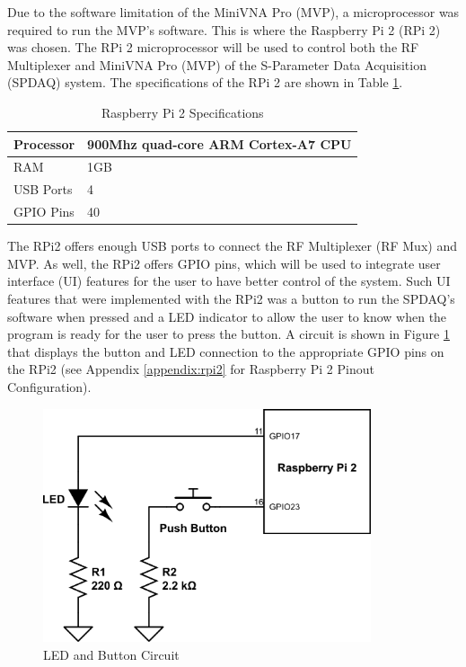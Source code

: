Due to the software limitation of the MiniVNA Pro (MVP), a microprocessor was required to run the MVP’s software. This is
where the Raspberry Pi 2 (RPi 2) was chosen.  The RPi 2 microprocessor will be used to control both the RF Multiplexer and
MiniVNA Pro (MVP) of the S-Parameter Data Acquisition (SPDAQ) system.  The specifications of the RPi 2 are shown in Table
\ref{table:RPi2}.

\begin{table}[h]
\centering
\caption{Raspberry Pi 2 Specifications \cite{RPi2}}
\label{table:RPi2}
\begin{tabular}{|l|l|}
\hline
Processor & 900Mhz quad-core ARM Cortex-A7 CPU 	\\ \hline
RAM       & 1GB									\\ \hline
USB Ports & 4                                  	\\ \hline
GPIO Pins & 40				\\ \hline
\end{tabular}
\end{table}

The RPi2 offers enough USB ports to connect the RF Multiplexer (RF Mux) and MVP.  As well, the RPi2 offers GPIO pins, which will be used to integrate user interface (UI) features for the user to have better control of the system.  Such UI features that were
implemented with the RPi2 was a button to run the SPDAQ’s software when pressed and a LED indicator to allow the user to know
when the program is ready for the user to press the button.  A circuit is shown in Figure \ref{fig:button} that displays the button
and LED connection to the appropriate GPIO pins on the RPi2 (see Appendix \ref{appendix:rpi2} for Raspberry Pi 2 Pinout Configuration).

\begin{figure}[h]
\begin{center}
\includegraphics[width=3.8in]{./images/rpi2.png}
\caption{LED and Button Circuit}
\label{fig:button}
\end{center}
\end{figure}

